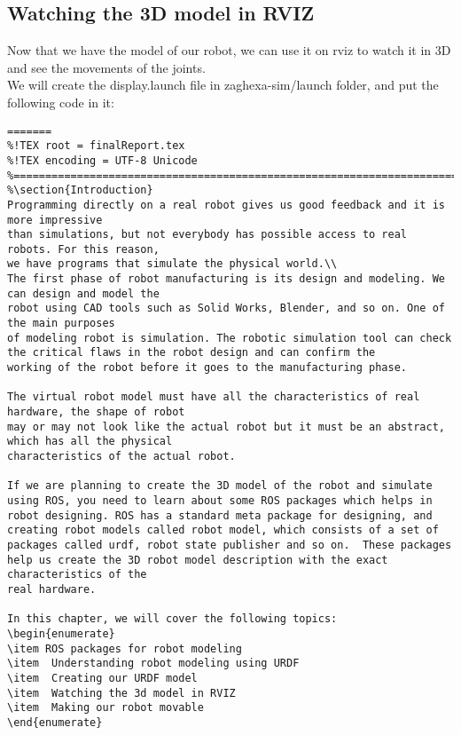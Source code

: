 	\subsection{Watching the 3D model in RVIZ}
	Now that we have the model of our robot, we can use it on rviz to watch it in 3D
	and see the movements of the joints.\\
	We will create the display.launch file in zaghexa-sim/launch folder,
	and put the following code in it:
	\begin{lstlisting}
=======
%!TEX root = finalReport.tex
%!TEX encoding = UTF-8 Unicode
%==============================================================================
%\section{Introduction}
Programming directly on a real robot gives us good feedback and it is more impressive
than simulations, but not everybody has possible access to real robots. For this reason,
we have programs that simulate the physical world.\\
The first phase of robot manufacturing is its design and modeling. We can design and model the 
robot using CAD tools such as Solid Works, Blender, and so on. One of the main purposes 
of modeling robot is simulation. The robotic simulation tool can check the critical flaws in the robot design and can confirm the 
working of the robot before it goes to the manufacturing phase.

The virtual robot model must have all the characteristics of real hardware, the shape of robot 
may or may not look like the actual robot but it must be an abstract, which has all the physical 
characteristics of the actual robot. 

If we are planning to create the 3D model of the robot and simulate using ROS, you need to learn about some ROS packages which helps in robot designing. ROS has a standard meta package for designing, and creating robot models called robot model, which consists of a set of packages called urdf, robot state publisher and so on.  These packages help us create the 3D robot model description with the exact characteristics of the 
real hardware.

In this chapter, we will cover the following topics:
\begin{enumerate}
\item ROS packages for robot modeling
\item  Understanding robot modeling using URDF
\item  Creating our URDF model
\item  Watching the 3d model in RVIZ
\item  Making our robot movable
\end{enumerate}


\end{lstlisting}
